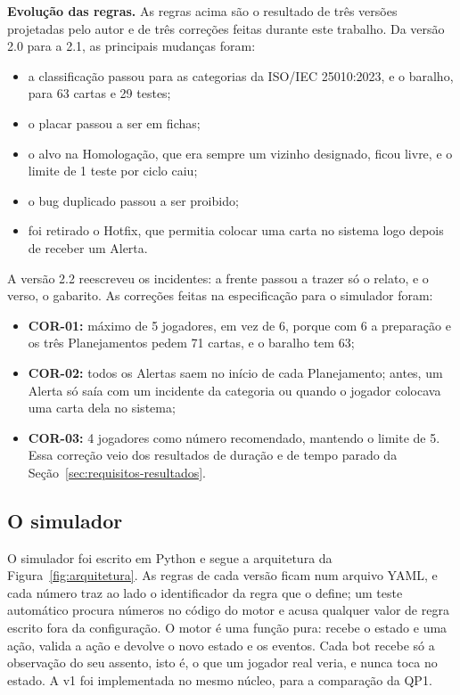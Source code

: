\textbf{Evolução das regras.} As regras acima são o resultado de três versões projetadas pelo autor e de três
correções feitas durante este trabalho. Da versão 2.0 para a 2.1, as principais mudanças foram:
\begin{itemize}
  \item a classificação passou para as categorias da ISO/IEC 25010:2023, e o baralho, para 63 cartas e 29 testes;
  \item o placar passou a ser em fichas;
  \item o alvo na Homologação, que era sempre um vizinho designado, ficou livre, e o limite de 1 teste por ciclo
    caiu;
  \item o bug duplicado passou a ser proibido;
  \item foi retirado o Hotfix, que permitia colocar uma carta no sistema logo depois de receber um Alerta.
\end{itemize}
A versão 2.2 reescreveu os incidentes: a frente passou a trazer só o relato, e o verso, o gabarito. As correções
feitas na especificação para o simulador foram:
\begin{itemize}
  \item \textbf{COR-01:} máximo de 5 jogadores, em vez de 6, porque com 6 a preparação e os três Planejamentos
    pedem 71 cartas, e o baralho tem 63;
  \item \textbf{COR-02:} todos os Alertas saem no início de cada Planejamento; antes, um Alerta só saía com um
    incidente da categoria ou quando o jogador colocava uma carta dela no sistema;
  \item \textbf{COR-03:} 4 jogadores como número recomendado, mantendo o limite de 5. Essa correção veio dos
    resultados de duração e de tempo parado da Seção~\ref{sec:requisitos-resultados}.
\end{itemize}

\subsection{O simulador}
\label{sec:simulador}

O simulador foi escrito em Python e segue a arquitetura da Figura~\ref{fig:arquitetura}. As regras de cada versão
ficam num arquivo YAML, e cada número traz ao lado o identificador da regra que o define; um teste automático
procura números no código do motor e acusa qualquer valor de regra escrito fora da configuração. O motor é uma
função pura: recebe o estado e uma ação, valida a ação e devolve o novo estado e os eventos. Cada bot recebe só a
observação do seu assento, isto é, o que um jogador real veria, e nunca toca no estado. A v1 foi implementada no
mesmo núcleo, para a comparação da QP1.

